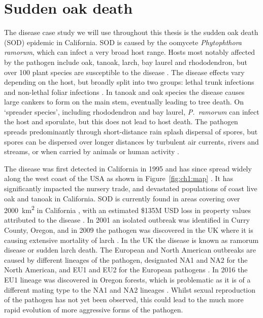 \section{Sudden oak death}

The disease case study we will use throughout this thesis is the sudden oak death (SOD) epidemic in California. SOD is caused by the oomycete \emph{Phytophthora ramorum}, which can infect a very broad host range. Hosts most notably affected by the pathogen include oak, tanoak, larch, bay laurel and rhododendron, but over 100 plant species are susceptible to the disease \citep{grunwald_emergence_2012}. The disease effects vary depending on the host, but broadly split into two groups: lethal trunk infections and non-lethal foliar infections \citep{rizzo_sudden_2003}. In tanoak and oak species the disease causes large cankers to form on the main stem, eventually leading to tree death. On `spreader species', including rhododendron and bay laurel, \emph{P.~ramorum} can infect the host and sporulate, but this does not lead to host death. The pathogen spreads predominantly through short-distance rain splash dispersal of spores, but spores can be dispersed over longer distances by turbulent air currents, rivers and streams, or when carried by animals or human activity \citep{grunwald_emergence_2012}.

The disease was first detected in California in 1995 and has since spread widely along the west coast of the USA as shown in Figure~\ref{fig:ch1:map} \citep{rizzo_sudden_2003, meentemeyer_epidemiological_2011}. It has significantly impacted the nursery trade, and devastated populations of coast live oak and tanoak in California. SOD is currently found in areas covering over \SI{2000}{\km\squared} in California \citep{grunwald_ecology_2019}, with an estimated \$135M USD loss in property values attributed to the disease \citep{kovacs_predicting_2011}. In 2001 an isolated outbreak was identified in Curry County, Oregon, and in 2009 the pathogen was discovered in the UK where it is causing extensive mortality of larch \citep{brasier_plant_2010}. In the UK the disease is known as ramorum disease or sudden larch death. The European and North American outbreaks are caused by different lineages of the pathogen, designated NA1 and NA2 for the North American, and EU1 and EU2 for the European pathogens \citep{grunwald_emergence_2012}. In 2016 the EU1 lineage was discovered in Oregon forests, which is problematic as it is of a different mating type to the NA1 and NA2 lineages \citep{grunwald_ecology_2019}. Whilst sexual reproduction of the pathogen has not yet been observed, this could lead to the much more rapid evolution of more aggressive forms of the pathogen.

